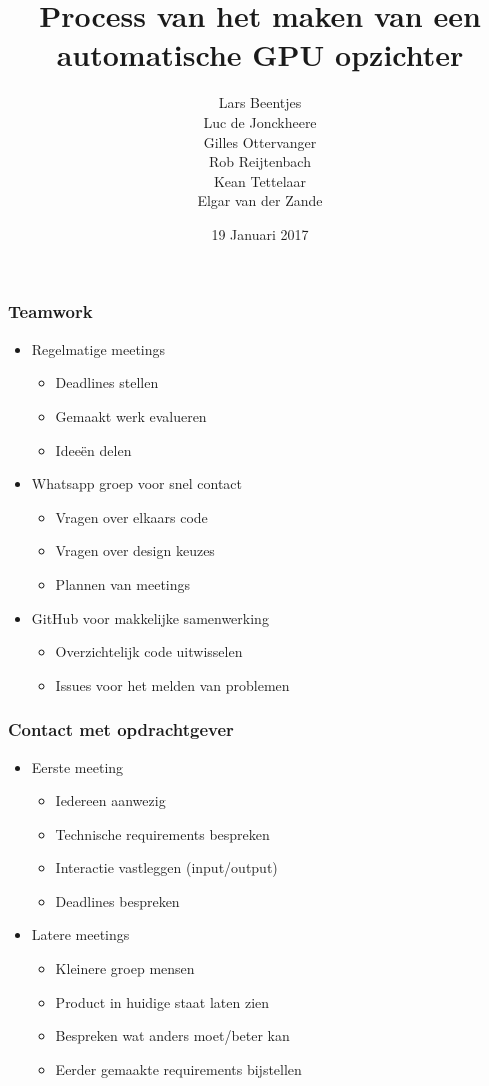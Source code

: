 \documentclass{beamer}
\title{Process van het maken van een automatische GPU opzichter}
\author{Lars Beentjes \\Luc de Jonckheere \\Gilles Ottervanger \\Rob Reijtenbach \\Kean Tettelaar \\Elgar van der Zande}
\date{19 Januari 2017}
\begin{document}
\frame{\titlepage}


\begin{frame}
\frametitle{Teamwork}
    \begin{itemize}
        \item Regelmatige meetings
        \begin{itemize}
            \item Deadlines stellen
            \item Gemaakt werk evalueren
            \item Idee\"en delen
        \end{itemize}
        \vspace{+2mm}

        \item Whatsapp groep voor snel contact
        \begin{itemize}
            \item Vragen over elkaars code
            \item Vragen over design keuzes
            \item Plannen van meetings
        \end{itemize}
        \vspace{+2mm}

        \item GitHub voor makkelijke samenwerking
        \begin{itemize}
            \item Overzichtelijk code uitwisselen
            \item Issues voor het melden van problemen
        \end{itemize}
    \end{itemize}
\end{frame}


\begin{frame}
\frametitle{Contact met opdrachtgever}
    \begin{itemize}
        \item Eerste meeting
        \begin{itemize}
            \item Iedereen aanwezig
            \item Technische requirements bespreken
            \item Interactie vastleggen (input/output)
            \item Deadlines bespreken
        \end{itemize}
        \vspace{+2mm}

        \item Latere meetings
        \begin{itemize}
            \item Kleinere groep mensen
            \item Product in huidige staat laten zien
            \item Bespreken wat anders moet/beter kan
            \item Eerder gemaakte requirements bijstellen
        \end{itemize}
    \end{itemize}
\end{frame}
\end{document}
